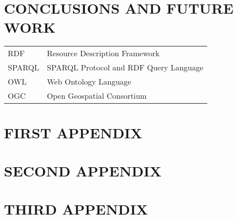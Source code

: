 \documentclass[inscr,ack,preface]{dithesis}
\begin{document}
\chapter{CONCLUSIONS AND FUTURE WORK}
  \lipsum[3-5]

\backmatter

\abbreviations
\begin{center}
	\renewcommand{\arraystretch}{1.5}
	\begin{longtable}{ l @{\qquad} l }
	\toprule
	RDF    & Resource Description Framework \\
	SPARQL & SPARQL Protocol and RDF Query Language \\
	OWL    & Web Ontology Language \\
	OGC    & Open Geospatial Consortium \\
	\bottomrule
	\end{longtable}
\end{center}

\begin{appendix}
\appendixstartedtrue

{}

\chapter{FIRST APPENDIX}
\chapter{SECOND APPENDIX}
\chapter{THIRD APPENDIX}
\end{appendix}



\end{document}
